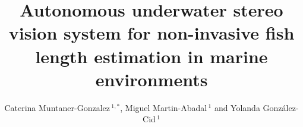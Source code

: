 \documentclass[utf8]{FrontiersinHarvard} %
\def\firstAuthorLast{Muntaner-Gonzalez {et~al.}} %
\def\Authors{Caterina Muntaner-Gonzalez\,$^{1,*}$, Miguel Martin-Abadal\,$^{1}$ and Yolanda González-Cid\,$^{1}$}
\begin{document}
\onecolumn
{}

\title[Autonomous fish length estimation]{Autonomous underwater stereo vision system for non-invasive fish length estimation in marine environments} %




\author[\firstAuthorLast ]{\Authors} %
\address{} %
\correspondance{} %

\extraAuth{}%


\maketitle
\end{document}
